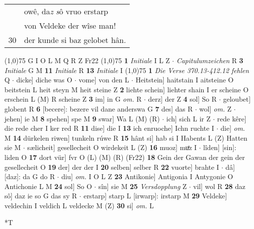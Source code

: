 \documentclass[8pt,a4paper,notitlepage]{article}
\begin{document}
\begin{table}[ht]
\begin{minipage}[t]{0.5\linewidth}
\begin{tabular}{rl}
 & owê, da\textit{z} \textit{s}ô vruo erstarp\\ 
 & von Veldeke der wîse man!\\ 
30 & der kunde si baz gelobet hân.\\ 
\end{tabular}
\scriptsize
\line(1,0){75} \newline
G I O L M Q R Z Fr22 \newline
\line(1,0){75} \newline
\textbf{1} \textit{Initiale} I L Z   $\cdot$ \textit{Capitulumzeichen} R  \textbf{3} \textit{Initiale} G M  \textbf{11} \textit{Initiale} R  \textbf{13} \textit{Initiale} I  \newline
\line(1,0){75} \newline
\textbf{1} \textit{Die Verse 370.13-412.12 fehlen} Q   $\cdot$ dicke] diche was O  $\cdot$ vome] von den L  $\cdot$ Heitstein] haitstain I aitsteine O beitstein L heit steyn M heit steine Z \textbf{2} liehte schein] liehter shain I er scheine O erschein L (M) R scheine Z \textbf{3} im] in G \textit{om.} R  $\cdot$ derz] der Z \textbf{4} sol] So R  $\cdot$ geloubet] globent R \textbf{6} [becere]: bezere vil dane anderswa G \textbf{7} des] das R  $\cdot$ wol] \textit{om.} Z  $\cdot$ jehen] ie M \textbf{8} spehen] spe M \textbf{9} swar] Wa L (M) (R)  $\cdot$ ich] sich L ir Z  $\cdot$ rede kêre] die rede cher I ker red R \textbf{11} dise] die I \textbf{13} ich enruoche] Ichn ruchte I  $\cdot$ die] \textit{om.} M \textbf{14} dürkelen riwen] tunkeln rúwe R \textbf{15} hânt si] hab si I Habents L (Z) Hatten sie M  $\cdot$ sælicheit] gesellecheit O wirdekeit L (Z) \textbf{16} muoz] muͤz I  $\cdot$ lîden] [sin]: liden O \textbf{17} dort vür] fvr O (L) (M) (R) (Fr22) \textbf{18} Gein der Gawan der gein der gesellecheit O \textbf{19} der] der der I \textbf{20} selben] selber R \textbf{22} vuorte] brahte I  $\cdot$ dâ] [daz]: da G do R  $\cdot$ diu] \textit{om.} I O L Z \textbf{23} Antikonie] Antigonia I Antygonie O Antichonie L M \textbf{24} sol] So O  $\cdot$ sîn] sie M \textbf{25} \textit{Versdopplung} Z   $\cdot$ vil] wol R \textbf{28} daz sô] daz ie so G das sy R  $\cdot$ erstarp] starp L [irwarp]: irstarp M \textbf{29} Veldeke] veldechin I veldich L veldecke M (Z) \textbf{30} si] \textit{om.} L \newline
\end{minipage}
\hspace{0.5cm}
\begin{minipage}[t]{0.5\linewidth}
\small
\begin{center}*T

\end{center}
\end{minipage}
\end{table}
\end{document}
